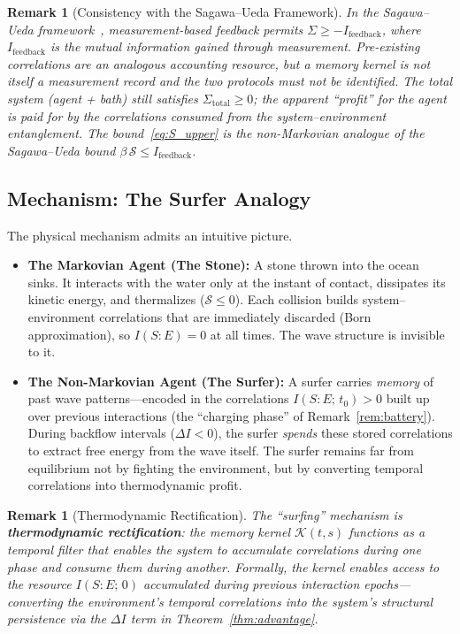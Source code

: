 \documentclass[12pt]{article}
\newtheorem{remark}[theorem]{Remark}
\begin{document}
\begin{remark}[Consistency with the Sagawa--Ueda Framework]
\label{rem:SU_consistency}
In the Sagawa--Ueda framework~\cite{SagawaUeda2010,SagawaUeda2012},
measurement-based feedback permits
$\Sigma \geq -I_{\mathrm{feedback}}$, where
$I_{\mathrm{feedback}}$ is the mutual information gained
through measurement.
Pre-existing correlations are an analogous accounting resource, but a
memory kernel is not itself a measurement record and the two protocols
must not be identified.
The total system (agent + bath) still satisfies
$\Sigma_{\mathrm{total}} \geq 0$; the apparent ``profit'' for
the agent is paid for by the correlations consumed from the
system--environment entanglement.
The bound~\eqref{eq:S_upper} is the non-Markovian analogue of
the Sagawa--Ueda bound $\beta\,\mathcal{S} \leq
I_{\mathrm{feedback}}$.
\end{remark}

\subsection{Mechanism: The Surfer Analogy}

The physical mechanism admits an intuitive picture.

\begin{itemize}
\item \textbf{The Markovian Agent (The Stone):}
A stone thrown into the ocean sinks.
It interacts with the water only at the instant of contact,
dissipates its kinetic energy, and thermalizes
($\mathcal{S} \leq 0$).
Each collision builds system--environment correlations that are
immediately discarded (Born approximation), so
$I(S{:}E) = 0$ at all times.
The wave structure is invisible to it.

\item \textbf{The Non-Markovian Agent (The Surfer):}
A surfer carries \emph{memory} of past wave patterns---encoded
in the correlations $I(S{:}E;\, t_0) > 0$ built up over
previous interactions (the ``charging phase'' of
Remark~\ref{rem:battery}).
During backflow intervals ($\Delta I < 0$), the surfer
\emph{spends} these stored correlations to extract free energy
from the wave itself.
The surfer remains far from equilibrium not by fighting the
environment, but by converting temporal correlations into
thermodynamic profit.
\end{itemize}

\begin{remark}[Thermodynamic Rectification]
\label{rem:rectification}
The ``surfing'' mechanism is \textbf{thermodynamic
rectification}: the memory kernel $\mathcal{K}(t,s)$ functions
as a temporal filter that enables the system to accumulate
correlations during one phase and consume them during another.
Formally, the kernel enables access to the resource
$I(S{:}E;\, 0)$ accumulated during previous interaction
epochs---converting the environment's temporal correlations
into the system's structural persistence via the
$\Delta I$ term in Theorem~\ref{thm:advantage}.
\end{remark}
\end{document}
